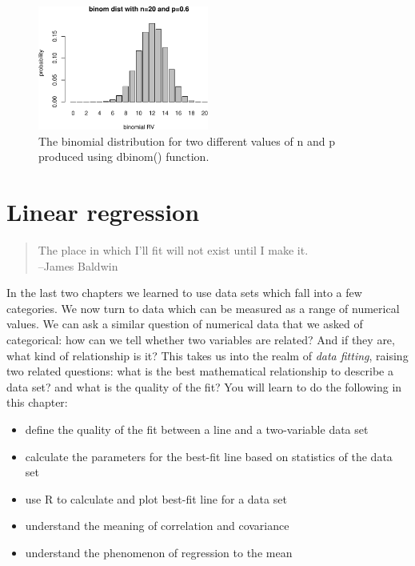 \documentclass[
  letterpaper,
  DIV=11,
  numbers=noendperiod]{scrreprt}
\providecommand{\tightlist}{%
  \setlength{\itemsep}{0pt}\setlength{\parskip}{0pt}}\usepackage{longtable,booktabs,array}
\begin{document}
\begin{figure}[H]

{\centering \includegraphics[width=0.5\textwidth,height=\textheight]{./probdist_files/figure-pdf/bin-dist-4-2.pdf}

}

\caption{The binomial distribution for two different values of n and p
produced using dbinom() function.}

\end{figure}


\hypertarget{linear-regression}{%
\chapter{Linear regression}\label{linear-regression}}

\begin{quote}
The place in which I'll fit will not exist until I make it.\\
--James Baldwin
\end{quote}

In the last two chapters we learned to use data sets which fall into a
few categories. We now turn to data which can be measured as a range of
numerical values. We can ask a similar question of numerical data that
we asked of categorical: how can we tell whether two variables are
related? And if they are, what kind of relationship is it? This takes us
into the realm of \emph{data fitting}, raising two related questions:
what is the best mathematical relationship to describe a data set? and
what is the quality of the fit? You will learn to do the following in
this chapter:

\begin{itemize}
\tightlist
\item
  define the quality of the fit between a line and a two-variable data
  set
\item
  calculate the parameters for the best-fit line based on statistics of
  the data set
\item
  use R to calculate and plot best-fit line for a data set
\item
  understand the meaning of correlation and covariance
\item
  understand the phenomenon of regression to the mean
\end{itemize}
\end{document}
